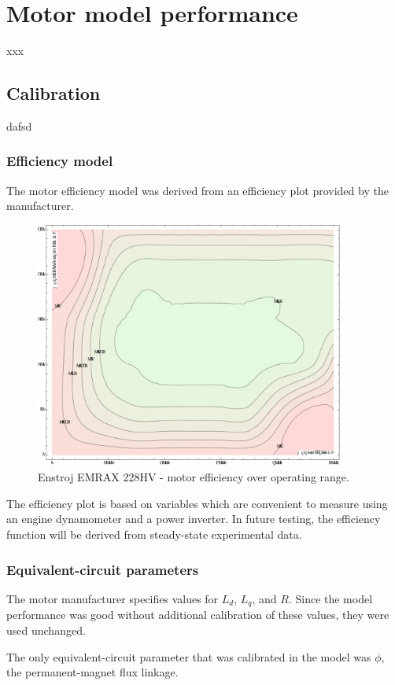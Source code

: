 \documentclass[../SimBALink.tex]{subfiles}
\begin{document}
\section{Motor model performance}
	xxx
	\subsection{Calibration}
		dafsd
		
		\subsubsection{Efficiency model}
			The motor efficiency model was derived from an efficiency plot provided by the manufacturer. 
			
			\begin{figure}[h]
				\centering
				\includegraphics[width=4in]{EMRAX_228HV_efficiency}
				\caption{Enstroj EMRAX 228HV - motor efficiency over operating range.}
			\end{figure}
			\FloatBarrier
			
			The efficiency plot is based on variables which are convenient to measure using an engine dynamometer and a power inverter. In future testing, the efficiency function will be derived from steady-state experimental data.
			
		\subsubsection{Equivalent-circuit parameters}
			The motor manufacturer specifies values for $L_d$, $L_q$, and $R$. Since the model performance was good without additional calibration of these values, they were used unchanged.
			
			The only equivalent-circuit parameter that was calibrated in the model was $\phi$, the permanent-magnet flux linkage.
						
\end{document}
